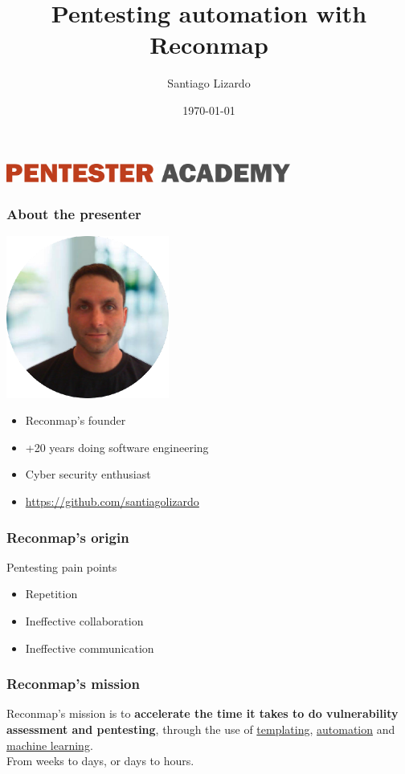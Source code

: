 \documentclass{beamer}
\title{Pentesting automation with \textbf{Reconmap}}
\author{Santiago Lizardo}
\date{\today}
\begin{document}
\begin{frame}
	\begin{center}
	\includegraphics[width=0.7\textwidth]{images/pentester-academy-logo.png}	
	\end{center}

	\maketitle
\end{frame}

\begin{frame}
	\frametitle{About the presenter}

	\includegraphics[width=0.4\textwidth]{images/santiago-lizardo.png}

	\begin{itemize}
		\item Reconmap's founder
		\item +20 years doing software engineering
		\item Cyber security enthusiast
		\item \href{https://github.com/santiagolizardo}{https://github.com/santiagolizardo}
	\end{itemize}
\end{frame}

\begin{frame}
	\frametitle{Reconmap's origin}

	Pentesting pain points	
	\begin{itemize}
		\item Repetition	
		\item Ineffective collaboration
		\item Ineffective communication
	\end{itemize}
\end{frame}

\begin{frame}
	\frametitle{Reconmap's mission}
	
	Reconmap's mission is to \textbf{accelerate the time it takes to do vulnerability assessment and pentesting}, through the use of \underline{templating}, \underline{automation} and \underline{machine learning}.\\
	From weeks to days, or days to hours.
\end{frame}
\end{document}
